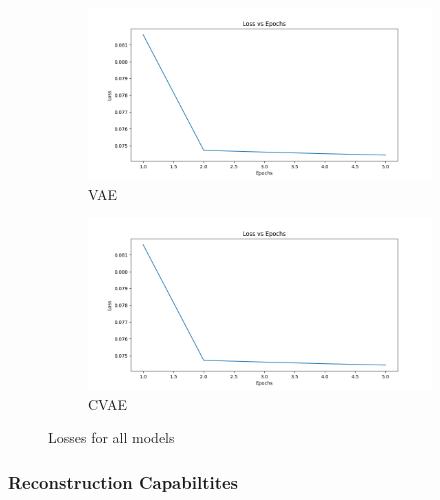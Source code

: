 \begin{figure}[!h]
  \begin{subfigure}[t]{.5\textwidth}
    \centering
    \includegraphics[width=\linewidth]{figures/loss.png}
    \caption{VAE}
  \end{subfigure}
  \hfill
  \begin{subfigure}[t]{.5\textwidth}
    \centering
    \includegraphics[width=\linewidth]{figures/loss.png}
    \caption{CVAE}
  \end{subfigure}
    \caption{Losses for all models}
\end{figure}

\subsubsection{Reconstruction Capabiltites}

